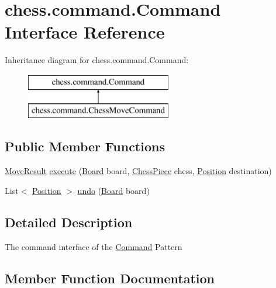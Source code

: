 \hypertarget{interfacechess_1_1command_1_1_command}{}\section{chess.\+command.\+Command Interface Reference}
\label{interfacechess_1_1command_1_1_command}
Inheritance diagram for chess.\+command.\+Command\+:\begin{figure}[H]
\begin{center}
\leavevmode
\includegraphics[height=2.000000cm]{interfacechess_1_1command_1_1_command}
\end{center}
\end{figure}
\subsection*{Public Member Functions}
\begin{DoxyCompactItemize}
\item 
\mbox{\hyperlink{enumchess_1_1models_1_1enums_1_1_move_result}{Move\+Result}} \mbox{\hyperlink{interfacechess_1_1command_1_1_command_a93071fc9ddc45d04e7c8e42cc78b5d6c}{execute}} (\mbox{\hyperlink{classchess_1_1models_1_1_board}{Board}} board, \mbox{\hyperlink{classchess_1_1models_1_1_chess_piece}{Chess\+Piece}} chess, \mbox{\hyperlink{classchess_1_1models_1_1_position}{Position}} destination)
\item 
List$<$ \mbox{\hyperlink{classchess_1_1models_1_1_position}{Position}} $>$ \mbox{\hyperlink{interfacechess_1_1command_1_1_command_a7e407e4a40124384e8262aa573fbeaac}{undo}} (\mbox{\hyperlink{classchess_1_1models_1_1_board}{Board}} board)
\end{DoxyCompactItemize}


\subsection{Detailed Description}
The command interface of the \mbox{\hyperlink{interfacechess_1_1command_1_1_command}{Command}} Pattern 

\subsection{Member Function Documentation}
\mbox{\label{interfacechess_1_1command_1_1_command_a93071fc9ddc45d04e7c8e42cc78b5d6c}} 
